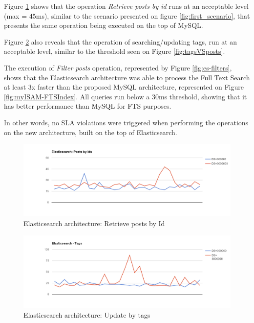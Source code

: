 Figure \ref{fig:retrieve-posts by-id-es} shows that the operation \textit{Retrieve posts by id} runs at an acceptable level (max = 45ms), similar to the scenario presented on figure \ref{fig:first_scenario}, that presents the same operation being executed on the top of MySQL.

Figure \ref{fig:search-tags} also reveals that the operation of searching/updating tags, run at an acceptable level, similar to the threshold seen on Figure \ref{fig:tagsVSposts}.

The execution of \textit{Filter posts} operation, represented by Figure \ref{fig:es-filters}, shows that the Elasticsearch architecture was able to process the Full Text Search at least 3x faster than the proposed MySQL architecture, represented on Figure \ref{fig:myISAM-FTSIndex}. All queries run below a 30ms threshold, showing that it has better performance than MySQL for FTS purposes.

In other words, no SLA violations were triggered when performing the operations on the new architecture, built on the top of Elasticsearch.

\begin{figure}[ht!]
	\centering
	\includegraphics[width=150mm]{Imagens/es-posts-by-ids.png}
	\caption{Elasticsearch architecture: Retrieve posts by Id\label{fig:retrieve-posts by-id-es}}
\end{figure}

\begin{figure}[ht!]
	\centering
	\includegraphics[width=150mm]{Imagens/es-search-tags.png}
	\caption{Elasticsearch architecture: Update by tags \label{fig:search-tags}}
\end{figure}

